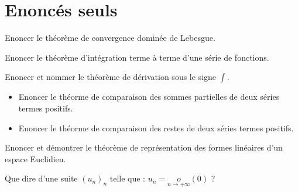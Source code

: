 \section{Enonc\'es seuls}

\begin{ques}
Enoncer le th\'eor\`eme de convergence domin\'ee de Lebesgue.
\end{ques}

\begin{ques}
Enoncer le th\'eor\`eme d'int\'egration terme \`a terme d'une s\'erie de fonctions.
\end{ques}

\begin{ques}
Enoncer et nommer le th\'eor\`eme de d\'erivation sous le signe $\int$.
\end{ques}

\begin{ques}
\begin{itemize}
\item Enoncer le th\'eorme de comparaison des sommes partielles de deux s\'eries  termes positifs.
\item Enoncer le th\'eorme de comparaison des restes de deux s\'eries  termes positifs.
\end{itemize}
\end{ques}

\begin{ques}
Enoncer et d\'emontrer le th\'eor\`eme de repr\'esentation des formes lin\'eaires d'un espace Euclidien.
\end{ques}

\begin{ques}
Que dire d'une suite $(u_n)_n$ telle que : $u_n = \underset{n \rightarrow + \infty}{o}(0)$ ?
\end{ques}
